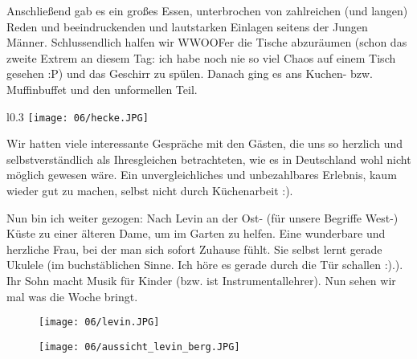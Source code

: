 Anschließend gab es ein großes Essen, unterbrochen von zahlreichen
(und langen) Reden und beeindruckenden und lautstarken Einlagen
seitens der Jungen Männer.  Schlussendlich halfen wir WWOOFer die
Tische abzuräumen (schon das zweite Extrem an diesem Tag: ich habe
noch nie so viel Chaos auf einem Tisch gesehen :P) und das Geschirr zu
spülen. Danach ging es ans Kuchen- bzw. Muffinbuffet und den
unformellen Teil.

\begin{wrapfigure}[12]{l}{0.3\textwidth}
  \centering
  \texttt{[image: 06/hecke.JPG]}
\end{wrapfigure}
Wir hatten viele interessante Gespräche mit den
Gästen, die uns so herzlich und selbstverständlich als Ihresgleichen
betrachteten, wie es in Deutschland wohl nicht möglich gewesen
wäre. Ein unvergleichliches und unbezahlbares Erlebnis, kaum wieder
gut zu machen, selbst nicht durch Küchenarbeit :).

Nun bin ich weiter gezogen: Nach Levin an der Ost- (für unsere
Begriffe West-) Küste zu einer älteren Dame, um im Garten zu
helfen. Eine wunderbare und herzliche Frau, bei der man sich sofort
Zuhause fühlt.  Sie selbst lernt gerade Ukulele (im buchstäblichen
Sinne. Ich höre es gerade durch die Tür schallen :).). Ihr Sohn macht
Musik für Kinder (bzw. ist Instrumentallehrer). Nun sehen wir mal was
die Woche bringt.
\begin{figure}[h]
  \centering
  \texttt{[image: 06/levin.JPG]}
\end{figure}
\begin{figure}[h]
  \centering
  \texttt{[image: 06/aussicht\_levin\_berg.JPG]}
\end{figure}
